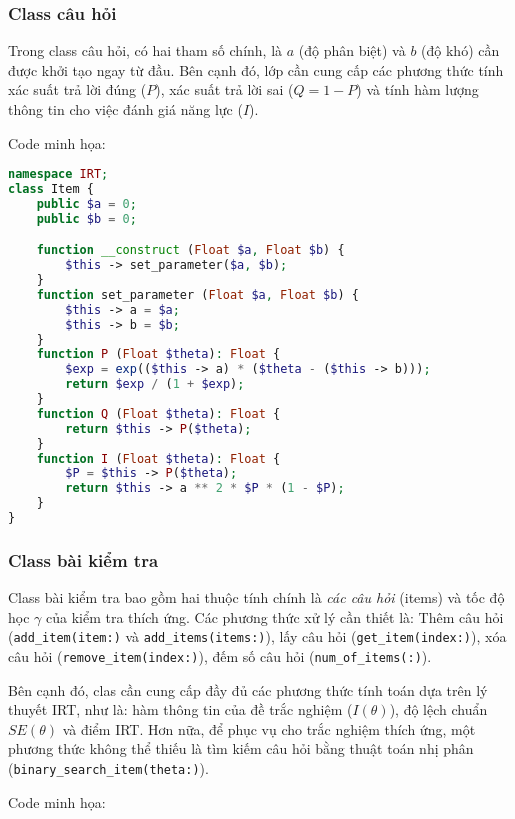 \subsubsection{Class câu hỏi}
Trong class câu hỏi, có hai tham số chính, là $a$ (độ phân biệt) và $b$ (độ khó) cần được khởi tạo ngay từ đầu. Bên cạnh đó, lớp cần cung cấp các phương thức tính xác suất trả lời đúng ($P$), xác suất trả lời sai ($Q=1-P$) và tính hàm lượng thông tin cho việc đánh giá năng lực ($I$).\par
\noindent Code minh họa:
\begin{lstlisting}[language=php,caption=Class câu hỏi]
namespace IRT;
class Item {
	public $a = 0;
	public $b = 0;

	function __construct (Float $a, Float $b) {
		$this -> set_parameter($a, $b);
	}
	function set_parameter (Float $a, Float $b) {
		$this -> a = $a;
		$this -> b = $b;
	}
	function P (Float $theta): Float {
		$exp = exp(($this -> a) * ($theta - ($this -> b)));
		return $exp / (1 + $exp);
	}
	function Q (Float $theta): Float {
		return $this -> P($theta);
	}
	function I (Float $theta): Float {
		$P = $this -> P($theta);
		return $this -> a ** 2 * $P * (1 - $P);
	}
}
\end{lstlisting}

\subsubsection{Class bài kiểm tra}
Class bài kiểm tra bao gồm hai thuộc tính chính là \textit{các câu hỏi} (items) và tốc độ học $\gamma$ của kiểm tra thích ứng. Các phương thức xử lý cần thiết là: Thêm câu hỏi (\texttt{add\_item(item:)} và \texttt{add\_items(items:)}), lấy câu hỏi (\texttt{get\_item(index:)}), xóa câu hỏi (\texttt{remove\_item(index:)}), đếm số câu hỏi (\texttt{num\_of\_items(:)}).\par
Bên cạnh đó, clas cần cung cấp đầy đủ các phương thức tính toán dựa trên lý thuyết IRT, như là: hàm thông tin của đề trắc nghiệm ($I(\theta)$), độ lệch chuẩn $SE(\theta)$ và điểm IRT. Hơn nữa, để phục vụ cho trắc nghiệm thích ứng, một phương thức không thể thiếu là tìm kiếm câu hỏi bằng thuật toán nhị phân (\texttt{binary\_search\_item(theta:)}).\par
\noindent Code minh họa:

